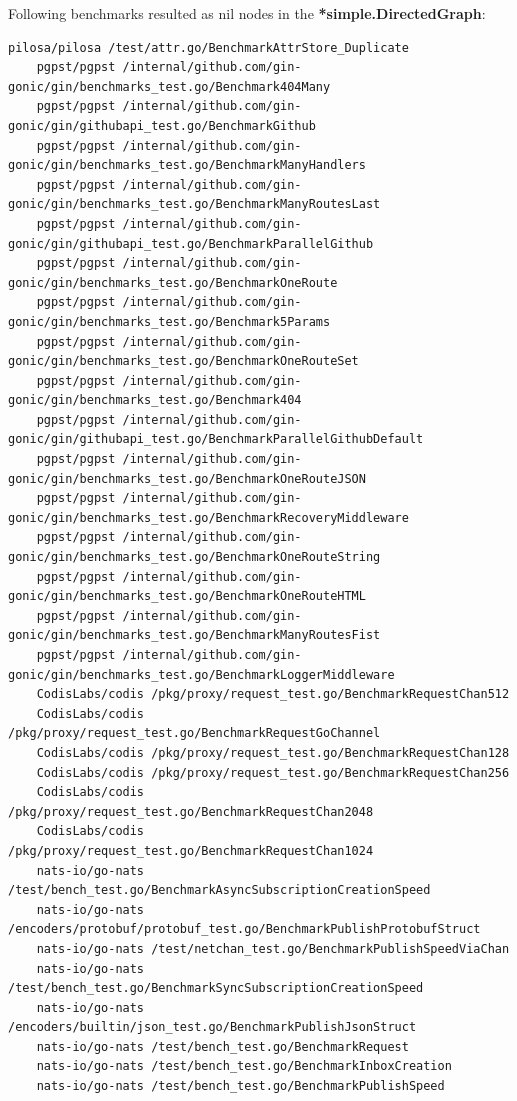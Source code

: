 \documentclass{seal_thesis}
\begin{document}
\label{incsv1butnotincsv2}
Following benchmarks resulted as nil nodes in the \textbf{*simple.DirectedGraph}:
\begin{lstlisting}[basicstyle=\tiny]
	pilosa/pilosa /test/attr.go/BenchmarkAttrStore_Duplicate
	pgpst/pgpst /internal/github.com/gin-gonic/gin/benchmarks_test.go/Benchmark404Many
	pgpst/pgpst /internal/github.com/gin-gonic/gin/githubapi_test.go/BenchmarkGithub
	pgpst/pgpst /internal/github.com/gin-gonic/gin/benchmarks_test.go/BenchmarkManyHandlers
	pgpst/pgpst /internal/github.com/gin-gonic/gin/benchmarks_test.go/BenchmarkManyRoutesLast
	pgpst/pgpst /internal/github.com/gin-gonic/gin/githubapi_test.go/BenchmarkParallelGithub
	pgpst/pgpst /internal/github.com/gin-gonic/gin/benchmarks_test.go/BenchmarkOneRoute
	pgpst/pgpst /internal/github.com/gin-gonic/gin/benchmarks_test.go/Benchmark5Params
	pgpst/pgpst /internal/github.com/gin-gonic/gin/benchmarks_test.go/BenchmarkOneRouteSet
	pgpst/pgpst /internal/github.com/gin-gonic/gin/benchmarks_test.go/Benchmark404
	pgpst/pgpst /internal/github.com/gin-gonic/gin/githubapi_test.go/BenchmarkParallelGithubDefault
	pgpst/pgpst /internal/github.com/gin-gonic/gin/benchmarks_test.go/BenchmarkOneRouteJSON
	pgpst/pgpst /internal/github.com/gin-gonic/gin/benchmarks_test.go/BenchmarkRecoveryMiddleware
	pgpst/pgpst /internal/github.com/gin-gonic/gin/benchmarks_test.go/BenchmarkOneRouteString
	pgpst/pgpst /internal/github.com/gin-gonic/gin/benchmarks_test.go/BenchmarkOneRouteHTML
	pgpst/pgpst /internal/github.com/gin-gonic/gin/benchmarks_test.go/BenchmarkManyRoutesFist
	pgpst/pgpst /internal/github.com/gin-gonic/gin/benchmarks_test.go/BenchmarkLoggerMiddleware
	CodisLabs/codis /pkg/proxy/request_test.go/BenchmarkRequestChan512
	CodisLabs/codis /pkg/proxy/request_test.go/BenchmarkRequestGoChannel
	CodisLabs/codis /pkg/proxy/request_test.go/BenchmarkRequestChan128
	CodisLabs/codis /pkg/proxy/request_test.go/BenchmarkRequestChan256
	CodisLabs/codis /pkg/proxy/request_test.go/BenchmarkRequestChan2048
	CodisLabs/codis /pkg/proxy/request_test.go/BenchmarkRequestChan1024
	nats-io/go-nats /test/bench_test.go/BenchmarkAsyncSubscriptionCreationSpeed
	nats-io/go-nats /encoders/protobuf/protobuf_test.go/BenchmarkPublishProtobufStruct
	nats-io/go-nats /test/netchan_test.go/BenchmarkPublishSpeedViaChan
	nats-io/go-nats /test/bench_test.go/BenchmarkSyncSubscriptionCreationSpeed
	nats-io/go-nats /encoders/builtin/json_test.go/BenchmarkPublishJsonStruct
	nats-io/go-nats /test/bench_test.go/BenchmarkRequest
	nats-io/go-nats /test/bench_test.go/BenchmarkInboxCreation
	nats-io/go-nats /test/bench_test.go/BenchmarkPublishSpeed

\end{lstlisting}
\end{document}
